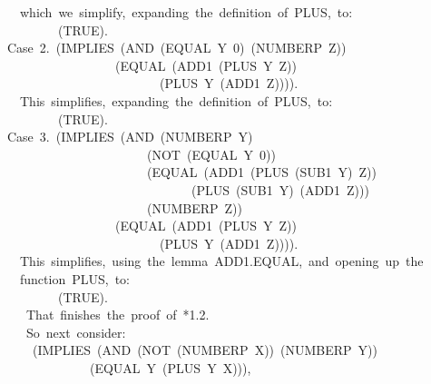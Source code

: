 \documentclass[11pt]{book}
\newenvironment{pubasis}{\begin{flushleft}\ttfamily\small}{\normalsize\rmfamily\end{flushleft}}
\begin{document}
\begin{pubasis}
~~~~which~we~simplify,~expanding~the~definition~of~PLUS,~to:\\

~~~~~~~~~~(TRUE).\\

~~Case~2.~(IMPLIES~(AND~(EQUAL~Y~0)~(NUMBERP~Z))\\
~~~~~~~~~~~~~~~~~~~(EQUAL~(ADD1~(PLUS~Y~Z))\\
~~~~~~~~~~~~~~~~~~~~~~~~~~(PLUS~Y~(ADD1~Z)))).\\

~~~~This~simplifies,~expanding~the~definition~of~PLUS,~to:\\

~~~~~~~~~~(TRUE).\\

~~Case~3.~(IMPLIES~(AND~(NUMBERP~Y)\\
~~~~~~~~~~~~~~~~~~~~~~~~(NOT~(EQUAL~Y~0))\\
~~~~~~~~~~~~~~~~~~~~~~~~(EQUAL~(ADD1~(PLUS~(SUB1~Y)~Z))\\
~~~~~~~~~~~~~~~~~~~~~~~~~~~~~~~(PLUS~(SUB1~Y)~(ADD1~Z)))\\
~~~~~~~~~~~~~~~~~~~~~~~~(NUMBERP~Z))\\
~~~~~~~~~~~~~~~~~~~(EQUAL~(ADD1~(PLUS~Y~Z))\\
~~~~~~~~~~~~~~~~~~~~~~~~~~(PLUS~Y~(ADD1~Z)))).\\

~~~~This~simplifies,~using~the~lemma~ADD1.EQUAL,~and~opening~up~the\\
~~~~function~PLUS,~to:\\

~~~~~~~~~~(TRUE).\\

~~~~~That~finishes~the~proof~of~*1.2.\\

~~~~~So~next~consider:\\

~~~~~~(IMPLIES~(AND~(NOT~(NUMBERP~X))~(NUMBERP~Y))\\
~~~~~~~~~~~~~~~(EQUAL~Y~(PLUS~Y~X))),\\


\end{pubasis}
\end{document}
